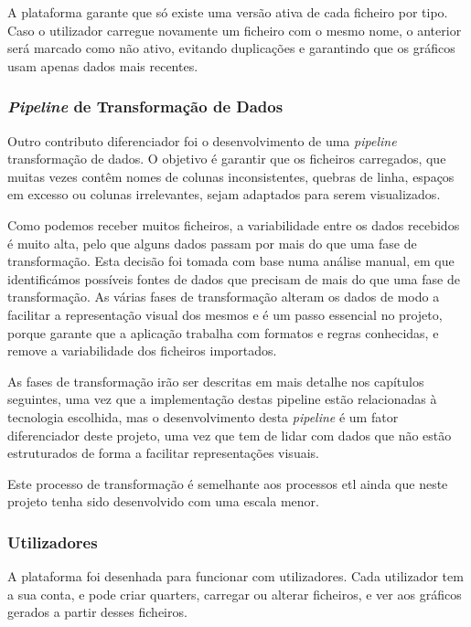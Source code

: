 A plataforma garante que só existe uma versão ativa de cada ficheiro por tipo. Caso o utilizador carregue novamente um ficheiro com o mesmo nome, o anterior será marcado como não ativo, evitando duplicações e garantindo que os gráficos usam apenas dados mais recentes. 

\subsubsection{\textit{Pipeline} de Transformação de Dados}

Outro contributo diferenciador foi o desenvolvimento de uma \textit{pipeline} transformação de dados. O objetivo é garantir que os ficheiros carregados, que muitas vezes contêm nomes de colunas inconsistentes, quebras de linha, espaços em excesso ou colunas irrelevantes, sejam adaptados para serem visualizados. 

Como podemos receber muitos ficheiros, a variabilidade entre os dados recebidos é muito alta, pelo que alguns dados passam por mais do que uma fase de transformação. Esta decisão foi tomada com base numa análise manual, em que identificámos possíveis fontes de dados que precisam de mais do que uma fase de transformação. As várias fases de transformação alteram os dados de modo a facilitar a representação visual dos mesmos e é um passo essencial no projeto, porque garante que a aplicação trabalha com formatos e regras conhecidas, e remove a variabilidade dos ficheiros importados.

As fases de transformação irão ser descritas em mais detalhe nos capítulos seguintes, uma vez que a implementação destas pipeline estão relacionadas à tecnologia escolhida, mas o desenvolvimento desta \textit{pipeline} é um fator diferenciador deste projeto, uma vez que tem de lidar com dados que não estão estruturados de forma a facilitar representações visuais. 

Este processo de transformação é semelhante aos processos \gls{etl} ainda que neste projeto tenha sido desenvolvido com uma escala menor.

\subsubsection{Utilizadores}

A plataforma foi desenhada para funcionar com utilizadores. Cada utilizador tem a sua conta, e pode criar quarters, carregar ou alterar ficheiros, e ver aos gráficos gerados a partir desses ficheiros.

